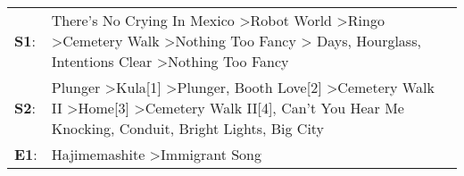 \begin{supertabular}{p{0.03\textwidth}p{0.92\textwidth}}
 \textbf{S1}:  &                             There's No Crying In Mexico\textsuperscript{} \textgreater \enspace Robot World\textsuperscript{} \textgreater \enspace Ringo\textsuperscript{} \textgreater \enspace Cemetery Walk\textsuperscript{} \textgreater \enspace Nothing Too Fancy\textsuperscript{} \textgreater {} Days\textsuperscript{}, \enspace Hourglass\textsuperscript{}, \enspace Intentions Clear\textsuperscript{} \textgreater \enspace Nothing Too Fancy\textsuperscript{}  \enspace  \\
 \textbf{S2}:  &  Plunger\textsuperscript{} \textgreater \enspace Kula[1]\textsuperscript{} \textgreater \enspace Plunger\textsuperscript{}, \enspace Booth Love[2]\textsuperscript{} \textgreater \enspace Cemetery Walk II\textsuperscript{} \textgreater \enspace Home[3]\textsuperscript{} \textgreater \enspace Cemetery Walk II[4]\textsuperscript{}, \enspace Can't You Hear Me Knocking\textsuperscript{}, \enspace Conduit\textsuperscript{}, \enspace Bright Lights, Big City\textsuperscript{}  \enspace  \\
 \textbf{E1}:  &                                                                                                                                                                                                                                                                                                                                                                                                   Hajimemashite\textsuperscript{} \textgreater \enspace Immigrant Song\textsuperscript{}  \enspace  \\
\end{supertabular}

